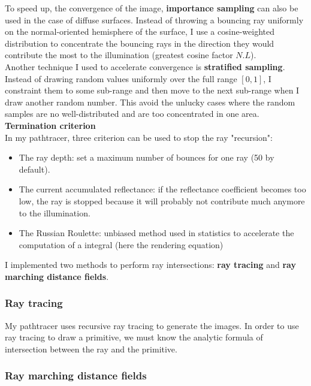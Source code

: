 \documentclass[a4paper,10pt]{article}
\begin{document}
\noindent
To speed up, the convergence of the image, \textbf{importance sampling} can also be used in the case of diffuse surfaces. Instead of throwing a bouncing ray uniformly on the normal-oriented hemisphere of the surface, I use a cosine-weighted distribution to concentrate the bouncing rays in the direction they would contribute the most to the illumination (greatest cosine factor $N.L$). \\

\noindent
Another technique I used to accelerate convergence is \textbf{stratified sampling}. Instead of drawing random values uniformly over the full range $[0, 1]$, I constraint them to some sub-range and then move to the next sub-range when I draw another random number. This avoid the unlucky cases where the random samples are no well-distributed and are too concentrated in one area. \\

\noindent
\textbf{Termination criterion}\\
In my pathtracer, three criterion can be used to stop the ray "recursion":
\begin{itemize}
	\item The ray depth: set a maximum number of bounces for one ray (50 by default).
	\item The current accumulated reflectance: if the reflectance coefficient becomes too low, the ray is stopped because it will probably not contribute much anymore to the illumination.
	\item The Russian Roulette: unbiased method used in statistics to accelerate the computation of a integral (here the rendering equation)
\end{itemize}


\noindent
I implemented two methods to perform ray intersections: \textbf{ray tracing} and \textbf{ray marching distance fields}.

\subsubsection{Ray tracing}

My pathtracer uses recursive ray tracing to generate the images. In order to use ray tracing to draw a primitive, we must know the analytic formula of intersection between the ray and the primitive.

\subsubsection{Ray marching distance fields}
\end{document}
